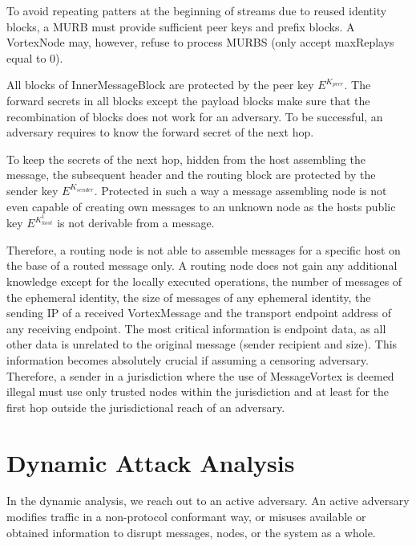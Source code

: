 To avoid repeating patters at the beginning of streams due to reused identity blocks, a MURB must provide sufficient peer keys and prefix blocks. A VortexNode may, however, refuse to process MURBS (only accept maxReplays equal to 0).

All blocks of InnerMessageBlock are protected by the peer key $E^{K_{peer}}$. The forward secrets in all blocks except the payload blocks make sure that the recombination of blocks does not work for an adversary. To be successful, an adversary requires to know the forward secret of the next hop.

To keep the secrets of the next hop, hidden from the host assembling the message, the subsequent header and the routing block are protected by the sender key $E^{K_{sender}}$. Protected in such a way a message assembling node is not even capable of creating own messages to an unknown node as the hosts public key $E^{K^{1}_{host}}$ is not derivable from a message.

Therefore, a routing node is not able to assemble messages for a specific host on the base of a routed message only. A routing node does not gain any additional knowledge except for the locally executed operations, the number of messages of the ephemeral identity, the size of messages of any ephemeral identity, the sending IP of a received VortexMessage and the transport endpoint address of any receiving endpoint. The most critical information is endpoint data, as all other data is unrelated to the original message (sender recipient and size). This information becomes absolutely crucial if assuming a censoring adversary. Therefore, a sender in a jurisdiction where the use of MessageVortex is deemed illegal must use only trusted nodes within the jurisdiction and at least for the first hop outside the jurisdictional reach of an adversary.

\chapter{Dynamic Attack Analysis}
In the dynamic analysis, we reach out to an active adversary. An active adversary modifies traffic in a non-protocol conformant way, or misuses available or obtained information to disrupt messages, nodes, or the system as a whole.

